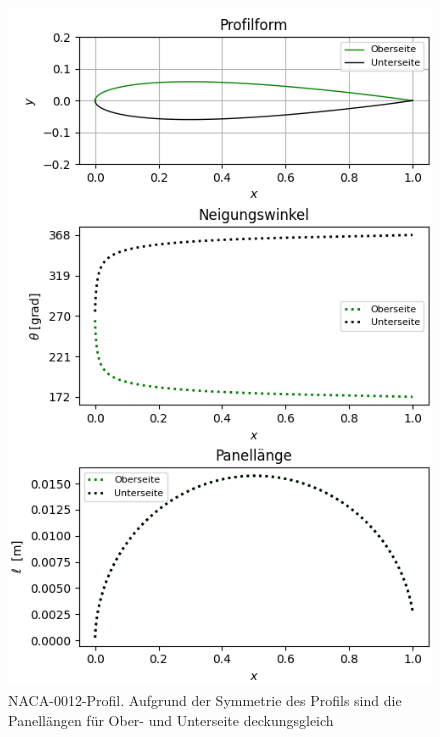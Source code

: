 \begin{figure}
\begin{center}
\includegraphics[scale=0.73]{figures/NACA0012.png} 
\caption{NACA-0012-Profil. Aufgrund der Symmetrie des Profils sind die Panellängen für Ober- und Unterseite deckungsgleich}
\label{fig:naca0012}
\end{center}
\end{figure}

\begin{table}
\label{tab:1}
\end{table}

